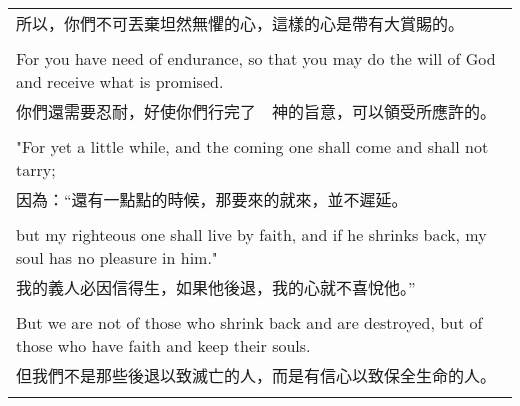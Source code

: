 \documentclass{book}
\begin{document}
\begin{tabularx}{\textwidth}{p{}}
所以，你們不可丟棄坦然無懼的心，這樣的心是帶有大賞賜的。 \\ \\
For you have need of endurance, so that you may do the will of God and receive what is promised. \\
你們還需要忍耐，好使你們行完了　神的旨意，可以領受所應許的。 \\ \\
"For yet a little while, and the coming one shall come and shall not tarry; \\
因為：“還有一點點的時候，那要來的就來，並不遲延。 \\ \\
but my righteous one shall live by faith, and if he shrinks back, my soul has no pleasure in him." \\
我的義人必因信得生，如果他後退，我的心就不喜悅他。” \\ \\
But we are not of those who shrink back and are destroyed, but of those who have faith and keep their souls. \\
但我們不是那些後退以致滅亡的人，而是有信心以致保全生命的人。 \\ \\

\hline
\end{tabularx}

\newpage
\end{document}
